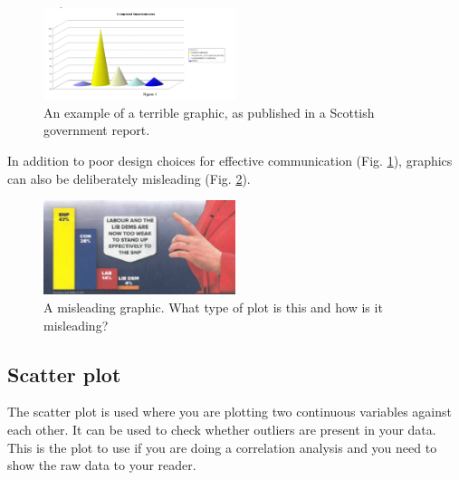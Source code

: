 \documentclass[
  11pt,
  a4paper,
]{book}
\begin{document}
\begin{figure}
\centerline{\includegraphics[width=0.5\textwidth]{figs/bad_fig_1.png}}
\caption{An example of a terrible graphic, as published in a Scottish government report.}
\label{fig:bad1}
\end{figure}

In addition to poor design choices for effective communication (Fig. \ref{fig:bad1}), graphics can also be deliberately misleading (Fig. \ref{fig:bad2}).

\begin{figure}
\centerline{\includegraphics[width=0.5\textwidth]{figs/bad_fig_2.png}}
\caption{A misleading graphic. What type of plot is this and how is it misleading?}
\label{fig:bad2}
\end{figure}

\hypertarget{scatter-plot}{%
\subsection{Scatter plot}\label{scatter-plot}}

The scatter plot is used where you are plotting two continuous variables against each other. It can be used to check whether outliers are present in your data. This is the plot to use if you are doing a correlation analysis and you need to show the raw data to your reader.
\end{document}
